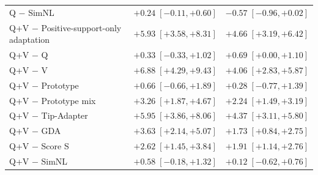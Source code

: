 \begin{table}[tp]
\begin{tabular*}{\textwidth}{@{\extracolsep{\fill}}lcc@{}}
Q $-$ SimNL & $+0.24\;[-0.11,+0.60]$ & $-0.57\;[-0.96,+0.02]$ \\
Q+V $-$ Positive-support-only adaptation & $+5.93\;[+3.58,+8.31]$ & $+4.66\;[+3.19,+6.42]$ \\
Q+V $-$ Q & $+0.33\;[-0.33,+1.02]$ & $+0.69\;[+0.00,+1.10]$ \\
Q+V $-$ V & $+6.88\;[+4.29,+9.43]$ & $+4.06\;[+2.83,+5.87]$ \\
Q+V $-$ Prototype & $+0.66\;[-0.66,+1.89]$ & $+0.28\;[-0.77,+1.39]$ \\
Q+V $-$ Prototype mix & $+3.26\;[+1.87,+4.67]$ & $+2.24\;[+1.49,+3.19]$ \\
Q+V $-$ Tip-Adapter & $+5.95\;[+3.86,+8.06]$ & $+4.37\;[+3.11,+5.80]$ \\
Q+V $-$ GDA & $+3.63\;[+2.14,+5.07]$ & $+1.73\;[+0.84,+2.75]$ \\
Q+V $-$ Score S & $+2.62\;[+1.45,+3.84]$ & $+1.91\;[+1.14,+2.76]$ \\
Q+V $-$ SimNL & $+0.58\;[-0.18,+1.32]$ & $+0.12\;[-0.62,+0.76]$ \\
\bottomrule
\end{tabular*}
\end{table}

